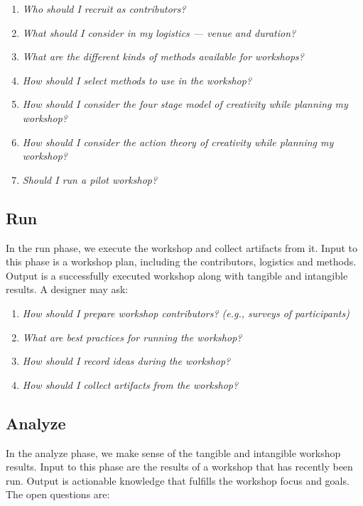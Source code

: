 \begin{enumerate}
    \item \emph{Who should I recruit as contributors?}
    \item \emph{What should I consider in my logistics  --- venue and duration?}
    \item \emph{What are the different kinds of methods available for workshops?} %
    \item \emph{How should I select methods to use in the workshop?}
    \item \emph{How should I consider the four stage model of creativity while planning my workshop?}
    \item \emph{How should I consider the action theory of creativity while planning my workshop?}
    \item \emph{Should I run a pilot workshop?}
\end{enumerate}

\subsection*{Run}

In the run phase, we execute the workshop and collect artifacts from it. Input to this phase is a workshop plan, including the contributors, logistics and methods. Output is a successfully executed workshop along with tangible and intangible results. A designer may ask:

\begin{enumerate}
    \item \emph{How should I prepare workshop contributors? (e.g., surveys of participants) }
    \item \emph{What are best practices for running the workshop?}
    \item \emph{How should I record ideas during the workshop?}
    \item \emph{How should I collect artifacts from the workshop?}
\end{enumerate}

\subsection*{Analyze}

In the analyze phase, we make sense of the tangible and intangible workshop results. Input to this phase are the results of a workshop that has recently been run. Output is actionable knowledge that fulfills the workshop focus and goals. The open questions are:

